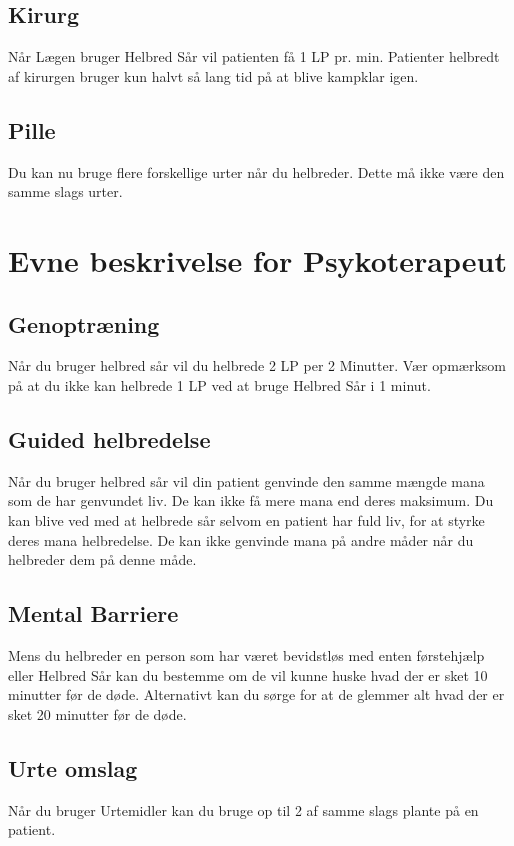 

\subsection*{Kirurg}
Når Lægen bruger Helbred Sår vil patienten få 1 LP pr. min. Patienter helbredt af kirurgen bruger kun halvt så lang tid på at blive kampklar igen.

\subsection*{Pille}
Du kan nu bruge flere forskellige urter når du helbreder. Dette må ikke være den samme slags urter.

\section*{Evne beskrivelse for Psykoterapeut}

\subsection*{Genoptræning}
Når du bruger helbred sår vil du helbrede 2 LP per 2 Minutter. Vær opmærksom på at du ikke kan helbrede 1 LP ved at bruge Helbred Sår i 1 minut.

\subsection*{Guided helbredelse}
Når du bruger helbred sår vil din patient genvinde den samme mængde mana som de har genvundet liv. De kan ikke få mere mana end deres maksimum. Du kan blive ved med at helbrede sår selvom en patient har fuld liv, for at styrke deres mana helbredelse. De kan ikke genvinde mana på andre måder når du helbreder dem på denne måde.

\subsection*{Mental Barriere}
Mens du helbreder en person som har været bevidstløs med enten førstehjælp eller Helbred Sår kan du bestemme om de vil kunne huske hvad der er sket 10 minutter før de døde. Alternativt kan du sørge for at de glemmer alt hvad der er sket 20 minutter før de døde.

\subsection*{Urte omslag}
Når du bruger Urtemidler kan du bruge op til 2 af samme slags plante på en patient.
